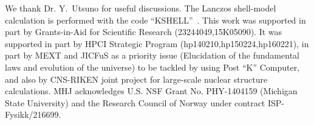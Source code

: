 \documentclass[aps,prl,twocolumn,groupedaddress,showkeys,showpacs,floatfix,superscriptaddress]{revtex4-1}
\newcommand\+{^\dagger}
\begin{document}
\begin{acknowledgments}
We thank Dr. Y.~Utsuno for useful discussions.
The Lanczos shell-model calculation is performed with the code
``KSHELL''~\cite{Shimizu:1613378}.
This work was supported in part by Grants-in-Aid for Scientific Research (23244049,15K05090). 
It was supported in part by HPCI Strategic Program (hp140210,hp150224,hp160221), in part by MEXT and JICFuS 
as a priority issue (Elucidation of the fundamental laws and evolution of the universe) 
to be tackled by using Post ``K'' Computer, 
and also by CNS-RIKEN joint project for large-scale nuclear structure
 calculations.
MHJ acknowledges U.S. NSF Grant No. PHY-1404159 (Michigan State University) and the Research Council of Norway
under contract ISP-Fysikk/216699. 
\end{acknowledgments}


%
\end{document}

